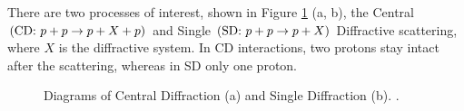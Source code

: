 There are two processes of interest, shown in Figure \ref{fig:sdcdgraph} (a, b), the Central $\left(\textnormal{CD: }p+p\to p+X+p\right)$ and Single $\left(\textnormal{SD: }p+p\to p+X\right)$ Diffractive scattering, where $X$ is the diffractive system. In CD interactions, two protons stay intact after the scattering, whereas in SD only one proton.
\begin{figure}[hb]
	\centering
	\parbox{0.484\textwidth}{
		\centering
		\begin{subfigure}[b]{\linewidth}{
				}
		\end{subfigure}
	}
	\quad
	\parbox{0.484\textwidth}{
		\centering
		\begin{subfigure}[b]{\linewidth}{
				}
		\end{subfigure}
	}%
	\caption[Diagrams of Central Diffraction and Single Diffraction]{Diagrams of Central Diffraction (a) and Single Diffraction (b). .}
	 \label{fig:sdcdgraph}
\end{figure}
